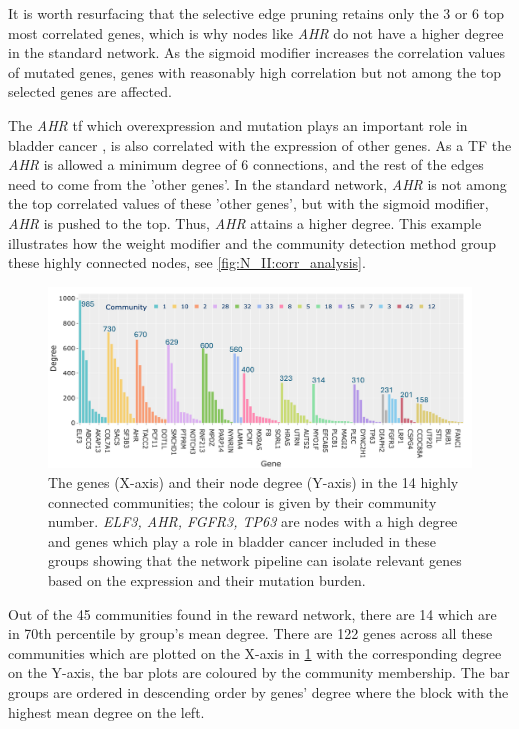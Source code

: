 It is worth resurfacing that the selective edge pruning retains only the 3 or 6 top most correlated genes, which is why nodes like \textit{AHR} do not have a higher degree in the standard network. As the sigmoid modifier increases the correlation values of mutated genes, genes with reasonably high correlation but not among the top selected genes are affected.

The \textit{AHR} \acrlong{tf} which overexpression and mutation plays an important role in bladder cancer \citep{Shi2020-km}, is also correlated with the expression of other genes. As a TF the \textit{AHR} is allowed a minimum degree of 6 connections, and the rest of the edges need to come from the 'other genes'. In the standard network, \textit{AHR} is not among the top correlated values of these 'other genes', but with the sigmoid modifier, \textit{AHR} is pushed to the top. Thus, \textit{AHR} attains a higher degree. This example illustrates how the weight modifier and the community detection method group these highly connected nodes, see \cref{fig:N_II:corr_analysis}.

\begin{figure}[!t]    
    \centering
    \includegraphics[width=1.0\textwidth,keepaspectratio]{Sections/Network_II/resources/reward/SmallCom_gene_labeled.png}
    \caption[Degree values of the highly connected genes]{The genes (X-axis) and their node degree (Y-axis) in the 14 highly connected communities; the colour is given by their community number. \textit{ELF3, AHR, FGFR3, TP63} are nodes with a high degree and genes which play a role in bladder cancer \citep{Robertson2017-mg} included in these groups showing that the network pipeline can isolate relevant genes based on the expression and their mutation burden.}
    \label{fig:N_II:genes_highConn}
\end{figure}


Out of the 45 communities found in the reward network, there are 14 which are in 70th percentile by group's mean degree. There are 122 genes across all these communities which are plotted on the X-axis in \cref{fig:N_II:genes_highConn} with the corresponding degree on the Y-axis, the bar plots are coloured by the community membership. The bar groups are ordered in descending order by genes' degree where the block with the highest mean degree on the left.


